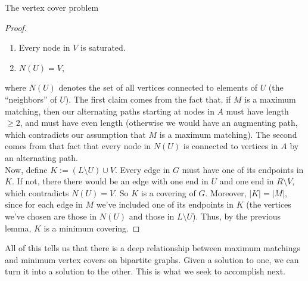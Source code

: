 \documentclass[11pt]{article}
\renewcommand{\'}{^{'}}
\begin{document}
\begin{section}{The vertex cover problem}
\begin{proof}
		\begin{enumerate}
			\item Every node in $V$ is saturated.
			\item $N(U) = V$,
		\end{enumerate}
		where $N(U)$ denotes the set of all vertices connected to elements of $U$ (the 
		``neighbors'' of $U$). The first claim comes from the fact that, if $M$ is a 
		maximum matching, then our alternating paths starting at nodes in $A$ must have 
		length $\geq 2$, and must have even length (otherwise we would have an augmenting path, 
		which contradicts our assumption that $M$ is a maximum matching).
		The second comes from that fact that every node in $N(U)$ is connected to vertices in 
		$A$ by an alternating path. \\
		Now, define $K := (L\setminus U)\cup V$. Every edge 
		in $G$ must have one of its endpoints in $K$. If not, there there would be an 
		edge with one end in $U$ and one end in $R\setminus V$, which contradicts 
		$N(U) = V$. So $K$ is a covering of $G$. Moreover, $|K| = |M|$, since for each 
		edge in $M$ we've included one of its endpoints in $K$ (the vertices we've chosen are 
		those in $N(U)$ and those in $L\setminus U$). Thus, by the previous lemma, $K$ is 
		a minimum covering.
	\end{proof}
	All of this tells us that there is a deep relationship between maximum matchings and 
	minimum vertex covers on bipartite graphs. Given a solution to one, we can turn it into a 
	solution to the other. This is what we seek to accomplish next. 
\end{section}
\end{document}
